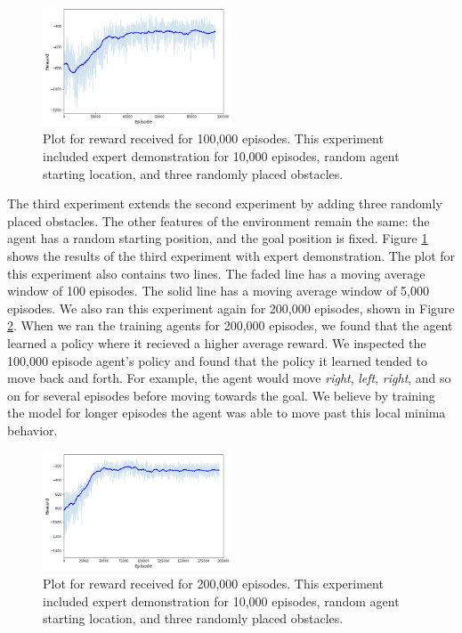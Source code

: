 \documentclass[conference]{IEEEtran}
\begin{document}
\begin{figure}
    \centering
    \includegraphics[width=0.5\textwidth]{assets/randomstartrandomobs100kep.png}
    \caption{Plot for reward received for 100,000 episodes. This experiment
        included expert demonstration for 10,000 episodes, random agent starting
        location, and three randomly placed obstacles.}
    \label{fig:randomstartrandomobs100kep}
\end{figure}

The third experiment extends the second experiment by adding three randomly
placed obstacles. The other features of the environment remain the same: the
agent has a random starting position, and the goal position is fixed. Figure
\ref{fig:randomstartrandomobs100kep} shows the results of the third experiment
with expert demonstration. The plot for this experiment also contains two lines.
The faded line has a moving average window of 100 episodes. The solid line has a
moving average window of 5,000 episodes. We also ran this experiment again for
200,000 episodes, shown in Figure \ref{fig:randomstartrandomobs200kep}. When we
ran the training agents for 200,000 episodes, we found that the agent learned a
policy where it recieved a higher average reward. We inspected the 100,000
episode agent's policy and found that the policy it learned tended to move back
and forth. For example, the agent would move \textit{right}, \textit{left},
\textit{right}, and so on for several episodes before moving towards the goal.
We believe by training the model for longer episodes the agent was able to move
past this local minima behavior.

\begin{figure}
    \centering
    \includegraphics[width=0.5\textwidth]{assets/randomstartrandomobs200kep.png}
    \caption{Plot for reward received for 200,000 episodes. This experiment
        included expert demonstration for 10,000 episodes, random agent starting
        location, and three randomly placed obstacles.}
    \label{fig:randomstartrandomobs200kep}
\end{figure}
\end{document}
